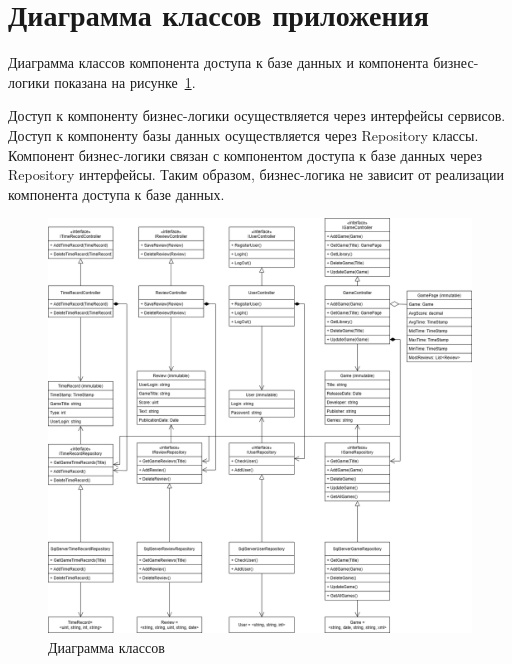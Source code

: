 \section{Диаграмма классов приложения}

Диаграмма классов компонента доступа к базе данных и компонента бизнес-логики показана на рисунке~\ref{fig:uml}. 

Доступ к компоненту бизнес-логики осуществляется через интерфейсы сервисов. Доступ к компоненту базы данных осуществляется через Repository классы. Компонент бизнес-логики связан с компонентом доступа к базе данных через Repository интерфейсы. Таким образом, бизнес-логика не зависит от реализации компонента доступа к базе данных. 

\begin{figure}[H]
	\centering
	\includegraphics[width=1\linewidth]{../imgs/uml}
	\captionsetup{justification=centering}
	\caption{Диаграмма классов}
	\label{fig:uml}
\end{figure}

